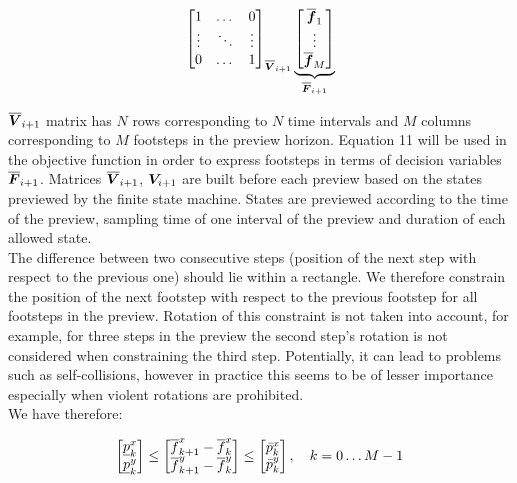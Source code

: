 \documentclass[a4paper]{article}
\begin{document}
\begin{equation}
\begin{split}
{\begin{bmatrix}
        1   &   \dots   &   0 \\
        \vdots  &   \ddots  &   \vdots \\
        0   &   \dots   &   1 \\
    \end{bmatrix}}_{\overline{\M{V}}_{i+1}}
    \underbrace{
    \begin{bmatrix}
        \overline{\M{f}}_1 \\
        \vdots\\
        \overline{\M{f}}_M\\
    \end{bmatrix}}_{\overline{\M{F}}_{i+1}}
\end{split}
\end{equation}

\noindent $\overline{\M{V}}_{i+1}$ matrix has $N$ rows corresponding to $N$ time intervals and $M$ columns corresponding to $M$ footsteps in the preview horizon. Equation 11
will be used in the objective function in order to express footsteps in terms of decision variables $\overline{\M{F}}_{i+1}$. Matrices $\overline{\M{V}}_{i+1}$, $\M{V}_{i+1}$ are built before each preview based on the states previewed by the finite state machine.
States are previewed according to the time of the preview, sampling time of one interval of the preview and duration of each allowed state. \\

\noindent The difference between two consecutive steps (position of the next step with respect to the previous one) should lie within a rectangle. We therefore constrain the position
of the next footstep with respect to the previous footstep for all footsteps in the preview. Rotation of this constraint is not taken into account, for example, for three steps in the preview the second step's rotation is not considered when constraining the third step.
Potentially, it can lead to problems such as self-collisions, however in practice this seems to be of lesser importance especially when violent rotations are prohibited. \\

\noindent We have therefore:

\begin{equation}
\begin{bmatrix}
    \underline{p}^{x}_{k} \\
    \underline{p}^{y}_{k}     
\end{bmatrix}
\le
\begin{bmatrix}
    \overline{{f}}^{x}_{k+1} - \overline{{f}}^{x}_{k} \\
    \overline{{f}}^{y}_{k+1} - \overline{{f}}^{y}_{k}
\end{bmatrix}
 \le 
\begin{bmatrix}
    \bar{p}^{x}_{k} \\
    \bar{p}^{y}_{k}     
\end{bmatrix}
, \quad k = 0 \dots M-1
\end{equation}
\end{document}

